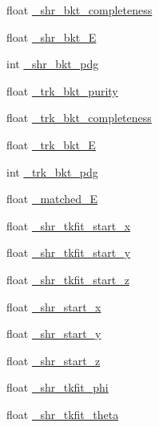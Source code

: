 \begin{DoxyCompactItemize}
\item 
float \hyperlink{classselection_1_1CC0piNpSelection_ac3c3c9895ca501c3b73f14addfddf495}{\-\_\-shr\-\_\-bkt\-\_\-completeness}
\item 
float \hyperlink{classselection_1_1CC0piNpSelection_aa1a21f48d99a4de5f1d444aa3d64dedf}{\-\_\-shr\-\_\-bkt\-\_\-\-E}
\item 
int \hyperlink{classselection_1_1CC0piNpSelection_aab09f93d7cd57031de714956414f3230}{\-\_\-shr\-\_\-bkt\-\_\-pdg}
\item 
float \hyperlink{classselection_1_1CC0piNpSelection_a39a84b873306f200a2350b4804429791}{\-\_\-trk\-\_\-bkt\-\_\-purity}
\item 
float \hyperlink{classselection_1_1CC0piNpSelection_aab22ce289e2d4a109440369e30fddf52}{\-\_\-trk\-\_\-bkt\-\_\-completeness}
\item 
float \hyperlink{classselection_1_1CC0piNpSelection_aa7a6076f1169185e0b2b02fbb03aba22}{\-\_\-trk\-\_\-bkt\-\_\-\-E}
\item 
int \hyperlink{classselection_1_1CC0piNpSelection_a7044de37ee4f3615ffe4bb15e9f00f8e}{\-\_\-trk\-\_\-bkt\-\_\-pdg}
\item 
float \hyperlink{classselection_1_1CC0piNpSelection_ac75aa3ac33061bbdd378594ee7e6e2e5}{\-\_\-matched\-\_\-\-E}
\item 
float \hyperlink{classselection_1_1CC0piNpSelection_a44002e3cc4d16dce6e6f61ee3a2bae6a}{\-\_\-shr\-\_\-tkfit\-\_\-start\-\_\-x}
\item 
float \hyperlink{classselection_1_1CC0piNpSelection_acd1826c44855b71bce92253f7ac1a758}{\-\_\-shr\-\_\-tkfit\-\_\-start\-\_\-y}
\item 
float \hyperlink{classselection_1_1CC0piNpSelection_a4d3591a8bb7abd9e320f35ca3bf311c2}{\-\_\-shr\-\_\-tkfit\-\_\-start\-\_\-z}
\item 
float \hyperlink{classselection_1_1CC0piNpSelection_ac0fb4dbd656f2f3fb2c12ffc02a0df7c}{\-\_\-shr\-\_\-start\-\_\-x}
\item 
float \hyperlink{classselection_1_1CC0piNpSelection_ade6717f479b053a2c2c9082e597d599f}{\-\_\-shr\-\_\-start\-\_\-y}
\item 
float \hyperlink{classselection_1_1CC0piNpSelection_a6e8b4637c8de2991e4d48291d3e90ddf}{\-\_\-shr\-\_\-start\-\_\-z}
\item 
float \hyperlink{classselection_1_1CC0piNpSelection_aefb0bc61c417330a448ababb5363ad8f}{\-\_\-shr\-\_\-tkfit\-\_\-phi}
\item 
float \hyperlink{classselection_1_1CC0piNpSelection_a11df391e482434665c389423bbb9ec5d}{\-\_\-shr\-\_\-tkfit\-\_\-theta}

\end{DoxyCompactItemize}
